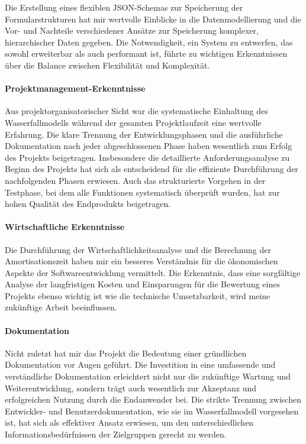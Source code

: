 \documentclass[a4paper,11pt]{article}
\begin{document}
\noindent Die Erstellung eines flexiblen JSON-Schemas zur Speicherung der Formularstrukturen hat mir wertvolle Einblicke in die Datenmodellierung und die Vor- und Nachteile verschiedener Ansätze zur Speicherung komplexer, hierarchischer Daten gegeben. Die Notwendigkeit, ein System zu entwerfen, das sowohl erweiterbar als auch performant ist, führte zu wichtigen Erkenntnissen über die Balance zwischen Flexibilität und Komplexität.

\paragraph{Projektmanagement-Erkenntnisse}
Aus projektorganisatorischer Sicht war die systematische Einhaltung des Wasserfallmodells während der gesamten Projektlaufzeit eine wertvolle Erfahrung. Die klare Trennung der Entwicklungsphasen und die ausführliche Dokumentation nach jeder abgeschlossenen Phase haben wesentlich zum Erfolg des Projekts beigetragen. Insbesondere die detaillierte Anforderungsanalyse zu Beginn des Projekts hat sich als entscheidend für die effiziente Durchführung der nachfolgenden Phasen erwiesen. Auch das strukturierte Vorgehen in der Testphase, bei dem alle Funktionen systematisch überprüft wurden, hat zur hohen Qualität des Endprodukts beigetragen.

\paragraph{Wirtschaftliche Erkenntnisse}
Die Durchführung der Wirtschaftlichkeitsanalyse und die Berechnung der Amortisationszeit haben mir ein besseres Verständnis für die ökonomischen Aspekte der Softwareentwicklung vermittelt. Die Erkenntnis, dass eine sorgfältige Analyse der langfristigen Kosten und Einsparungen für die Bewertung eines Projekts ebenso wichtig ist wie die technische Umsetzbarkeit, wird meine zukünftige Arbeit beeinflussen.

\paragraph{Dokumentation}
Nicht zuletzt hat mir das Projekt die Bedeutung einer gründlichen Dokumentation vor Augen geführt. Die Investition in eine umfassende und verständliche Dokumentation erleichtert nicht nur die zukünftige Wartung und Weiterentwicklung, sondern trägt auch wesentlich zur Akzeptanz und erfolgreichen Nutzung durch die Endanwender bei. Die strikte Trennung zwischen Entwickler- und Benutzerdokumentation, wie sie im Wasserfallmodell vorgesehen ist, hat sich als effektiver Ansatz erwiesen, um den unterschiedlichen Informationsbedürfnissen der Zielgruppen gerecht zu werden.
\end{document}
